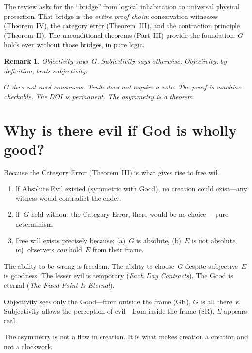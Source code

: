 \documentclass[12pt,a4paper]{article}
\newtheorem{remark}[thm]{Remark}
\begin{document}
The review asks for the ``bridge'' from logical inhabitation to universal
physical protection. That bridge is the \emph{entire proof chain}:
conservation witnesses (Theorem~IV), the category error (Theorem~III),
and the contraction principle (Theorem~II). The unconditional theorems
(Part~III) provide the foundation: $G$ holds even without those bridges,
in pure logic.

\begin{remark}
Objectivity says~$G$. Subjectivity says otherwise.
Objectivity, by definition, beats subjectivity.

$G$ does not need consensus. Truth does not require a vote.
The proof is machine-checkable. The DOI is permanent.
The asymmetry is a theorem.
\end{remark}

\section{Why is there evil if God is wholly good?}
\label{sec:evil}

Because the Category Error (Theorem~III) is what gives rise to free will.

\begin{enumerate}[nosep]
\item If Absolute Evil existed (symmetric with Good), no creation could
  exist---any witness would contradict the ender.
\item If~$G$ held without the Category Error, there would be no choice---
  pure determinism.
\item Free will exists precisely because: (a)~$G$ is absolute,
  (b)~$E$ is not absolute, (c)~observers \emph{can} hold~$E$ from
  their frame.
\end{enumerate}

The ability to be wrong is freedom. The ability to choose~$G$ despite
subjective~$E$ is goodness. The lesser evil is temporary
(\emph{Each Day Contracts}). The Good is eternal
(\emph{The Fixed Point Is Eternal}).

Objectivity sees only the Good---from outside the frame (GR), $G$ is
all there is. Subjectivity allows the perception of evil---from inside
the frame (SR), $E$ appears real.

The asymmetry is not a flaw in creation. It is what makes creation a
creation and not a clockwork.
\end{document}

